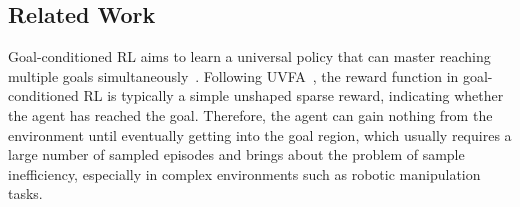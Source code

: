 \documentclass[journal]{IEEEtran}
\begin{document}


\subsection{Related Work}
Goal-conditioned RL aims to learn a universal policy that can master reaching multiple goals simultaneously~\citep{liu2022goal}.
Following UVFA~\citep{schaul2015universal}, the reward function in goal-conditioned RL is typically a simple unshaped sparse reward, indicating whether the agent has reached the goal. Therefore, the agent can gain nothing from the environment until eventually getting into the goal region, which usually requires a large number of sampled episodes and brings about the problem of sample inefficiency, especially in complex environments such as robotic manipulation tasks.
\end{document}
